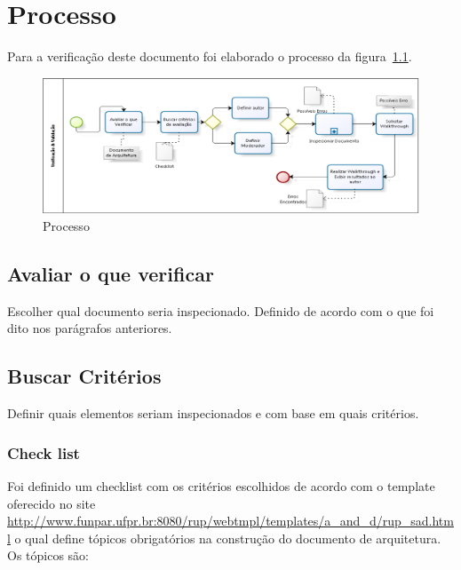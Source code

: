 \chapter{Processo}

Para a verificação deste documento foi elaborado o processo da figura~\ref{fig:processo}.


\begin{figure}[H]
  \center
  \includegraphics[width=1\textwidth]{figuras/processo.png}
  \caption{Processo}
  \label{fig:processo}
\end{figure}

\section{Avaliar o que verificar}

Escolher qual documento seria inspecionado. Definido de acordo com o que foi dito nos parágrafos anteriores. 

\section{Buscar Critérios}

Definir quais elementos seriam inspecionados e com base em quais critérios. 

    \subsection{Check list}
    Foi definido um checklist com os critérios escolhidos de acordo com o template oferecido no site \url{http://www.funpar.ufpr.br:8080/rup/webtmpl/templates/a_and_d/rup_sad.html} o qual define tópicos obrigatórios na construção do documento de arquitetura. Os tópicos são: 

